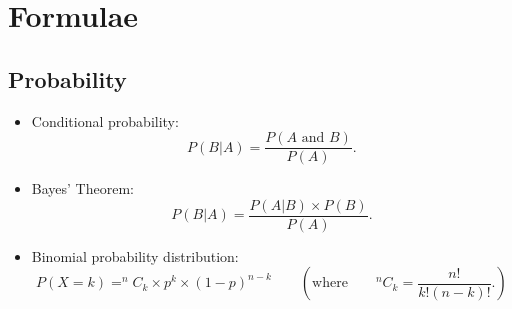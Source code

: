 \documentclass[a4paper,12pt]{article}
\begin{document}
\begin{itemize}
\begin{itemize}
\begin{itemize}
\end{itemize}
\newpage










\newpage
\section*{Formulae}
\subsection*{Probability}
\begin{itemize}

\item Conditional probability:
\begin{equation*}
P(B|A)=\frac{P\left( A\text{ and }B\right) }{P\left( A\right) }.
\end{equation*}


\item Bayes' Theorem:
\begin{equation*}
P(B|A)=\frac{P\left(A|B\right) \times P(B) }{P\left( A\right) }.
\end{equation*}


\item Binomial probability distribution:
\begin{equation*}
P(X = k) = ^{n}C_{k} \times p^{k} \times \left( 1-p\right) ^{n-k}\qquad \left( \text{where}\qquad
^{n}C_{k} =\frac{n!}{k!\left(n-k\right) !}. \right)
\end{equation*}


\end{itemize}
\end{itemize}
\end{itemize}
\end{document}
